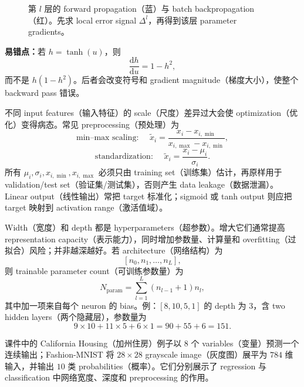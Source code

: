 \begin{figure}[htbp]
  \centering
  \resizebox{0.98\textwidth}{!}{}
  \caption{第 $l$ 层的 forward propagation（蓝）与 batch backpropagation（红）。先求 local error signal $\Delta^l$，再得到该层 parameter gradients。}
  \label{fig:sc4001-l04-forward-backward}
\end{figure}

\textbf{易错点：}若 $h=\tanh(u)$，则
\[
  \boxed{\frac{\mathrm dh}{\mathrm du}=1-h^2},
\]
而不是 $h(1-h^2)$。后者会改变符号和 gradient magnitude（梯度大小），使整个 backward pass 错误。


不同 input features（输入特征）的 scale（尺度）差异过大会使 optimization（优化）变得病态。常见 preprocessing（预处理）为
\[
  \text{min--max scaling: }\quad
  \widetilde x_i=\frac{x_i-x_{i,\min}}{x_{i,\max}-x_{i,\min}},
\]
\[
  \text{standardization: }\quad
  \widetilde x_i=\frac{x_i-\mu_i}{\sigma_i}.
\]
所有 $\mu_i,\sigma_i,x_{i,\min},x_{i,\max}$ 必须只由 training set（训练集）估计，再原样用于 validation/test set（验证集/测试集），否则产生 data leakage（数据泄漏）。Linear output（线性输出）常把 target 标准化；sigmoid 或 tanh output 则应把 target 映射到 activation range（激活值域）。

Width（宽度）和 depth 都是 hyperparameters（超参数）。增大它们通常提高 representation capacity（表示能力），同时增加参数量、计算量和 overfitting（过拟合）风险；并非越深越好。若 architecture（网络结构）为
\[
  [n_0,n_1,\ldots,n_L],
\]
则 trainable parameter count（可训练参数量）为
\[
  \boxed{N_{\mathrm{param}}
    =\sum_{l=1}^{L}(n_{l-1}+1)n_l},
\]
其中加一项来自每个 neuron 的 bias。例：$[8,10,5,1]$ 的 depth 为 $3$，含 two hidden layers（两个隐藏层），参数量为
\[
  9\times10+11\times5+6\times1
  =90+55+6=\boxed{151}.
\]

课件中的 California Housing（加州住房）例子以 $8$ 个 variables（变量）预测一个连续输出；Fashion-MNIST 将 $28\times28$ grayscale image（灰度图）展平为 $784$ 维输入，并输出 $10$ 类 probabilities（概率）。它们分别展示了 regression 与 classification 中网络宽度、深度和 preprocessing 的作用。

\FloatBarrier
{}

